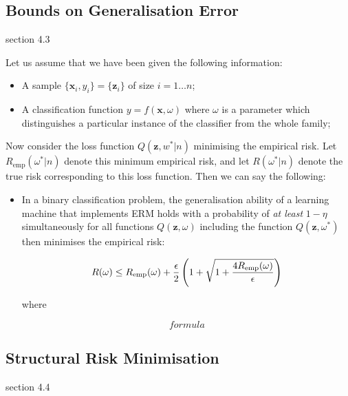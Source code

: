 \subsection{Bounds on Generalisation Error}
\cite{Cherkassky98} section 4.3

Let us assume that we have been given the following information:

\begin{itemize}

\item	A sample $\{\mathbf{x}_i, y_i\} = \{\mathbf{z}_i\}$ of size
	$i=1 \ldots n$;

\item	A classification function $y = f(\mathbf{x}, \omega)$ where
	$\omega$ is a parameter which distinguishes a particular
	instance of the classifier from the whole family;

\end{itemize}

Now consider the loss function $Q(\mathbf{z}, w^* | n)$ minimising the
empirical risk.  Let $R_{\mathrm{emp}}(\omega^* | n)$ denote this
minimum empirical risk, and let $R(\omega^* | n)$ denote the true risk
corresponding to this loss function.  Then we can say the following:

\begin{itemize}

\item	In a binary classification problem, the generalisation ability
	of a learning machine that implements ERM holds with a
	probability of \emph{at least} $1-\eta$ simultaneously for
	all functions $Q(\mathbf{z}, \omega)$ including the function
	$Q(\mathbf{z}, \omega^*)$ then minimises the empirical risk:

	\begin{equation}
	R(\omega) \leq R_{\mathrm{emp}}(\omega) + \frac{\epsilon}{2} \left(
	1 + \sqrt{1 + \frac{4 R_{\mathrm{emp}}(\omega)}{\epsilon}} \right)
	\end{equation}

	where

	\begin{equation}
	formula
	\end{equation}

\end{itemize}


\subsection{Structural Risk Minimisation}
\cite{Cherkassky98} section 4.4




